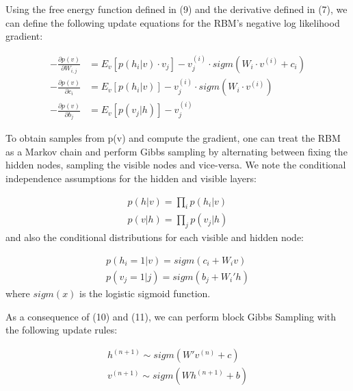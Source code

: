 \documentclass[journal]{IEEEtran}
\begin{document}
Using the free energy function defined in (9) and the derivative defined in (7), we can define the following update equations for the RBM's negative log likelihood gradient:

\begin{equation}
\begin{aligned}
- \frac{\partial p(v)}{\partial W_{i,j}} &= E_{v}[p(h_{i}|v)\cdot v_{j}] - v_{j}^{(i)}\cdot sigm(W_{i} \cdot v^{(i)} + c_{i})\\
- \frac{\partial p(v)}{\partial c_{i}} &= E_{v}[p(h_{i}|v)] - v_{j}^{(i)}\cdot sigm(W_{i} \cdot v^{(i)})\\
- \frac{\partial p(v)}{\partial b_{j}} &= E_{v}[p(v_{j}|h)] - v_{j}^{(i)}
\end{aligned}
\end{equation}

To obtain samples from p(v) and compute the gradient, one can treat the RBM as a Markov chain and perform Gibbs sampling by alternating between fixing the hidden nodes, sampling the visible nodes and vice-versa. We note the conditional independence assumptions for the hidden and visible layers:

\begin{equation}
\begin{aligned}
p(h|v) = \prod\limits_{i} p(h_{i}|v)\\
p(v|h) = \prod\limits_{j} p(v_{j}|h)
\end{aligned}
\end{equation} and also the conditional distributions for each visible and hidden node:

\begin{equation}
\begin{aligned}
p(h_{i} = 1|v) = sigm(c_{i} + W_{i}v)\\
p(v_{j} = 1|j) = sigm(b_{j} + W_{i}'h)
\end{aligned}
\end{equation} where $sigm(x)$ is the logistic sigmoid function.

As a consequence of (10) and (11), we can perform block Gibbs Sampling with the following update rules:

\begin{equation}
\begin{aligned}
h^{(n+1)} \sim sigm(W'v^{(n)} + c)\\
v^{(n+1)} \sim sigm(Wh^{(n+1)} + b)
\end{aligned}
\end{equation}
\end{document}
